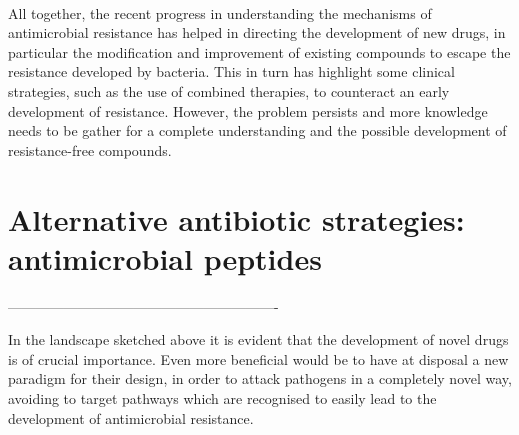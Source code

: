 \hspace{0.5cm}
\\
All together, the recent progress in understanding the mechanisms of antimicrobial resistance has helped in directing the development of new drugs, in particular the modification and improvement of existing compounds to escape the resistance developed by bacteria. This in turn has highlight some clinical strategies, such as the use of combined therapies, to counteract an early development of resistance. However, the problem persists and more knowledge needs to be gather for a complete understanding and the possible development of resistance-free compounds.


\section{Alternative antibiotic strategies: antimicrobial peptides}

%











































----------------------------------------------------------

In the landscape sketched above it is evident that the development of novel drugs is of crucial importance. Even more beneficial would be to have at disposal a new paradigm for their design, in order to attack pathogens in a completely novel way, avoiding to target pathways which are recognised to easily lead to the development of antimicrobial resistance.


